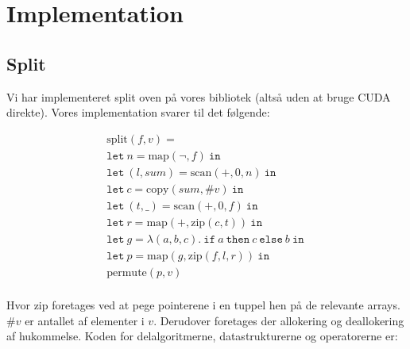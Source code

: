 

\section{Implementation}
\label{implementation}

\subsection{Split}

Vi har implementeret split oven på vores bibliotek (altså uden at bruge
CUDA direkte). Vores implementation svarer til det følgende:

\[
\begin{array}{l}
\mbox{split} (f, v) = \\
\mathtt{let\ } n = \mbox{map} (\neg, f) \mathtt{\ in\ } \\
\mathtt{let\ } (l, sum) = \mbox{scan} (+, 0, n) \mathtt{\ in\ } \\
\mathtt{let\ } c = \mbox{copy} (sum, \#v) \mathtt{\ in\ } \\
\mathtt{let\ } (t, \_) = \mbox{scan} (+, 0, f) \mathtt{\ in\ } \\
\mathtt{let\ } r = \mbox{map} (+, \mbox{zip}(c, t)) \mathtt{\ in\ } \\
\mathtt{let\ } g = \lambda (a, b, c). \mathtt{\ if\ } a \mathtt{\ then\ } c \mathtt{\ else\ } b \mathtt{\ in\ } \\
\mathtt{let\ } p = \mbox{map} (g, \mbox{zip} (f, l, r)) \mathtt{\ in\ } \\
\mbox{permute} (p, v) \\
\end{array}
\]

Hvor $\mbox{zip}$ foretages ved at pege pointerene i en tuppel
hen på de relevante arrays. $\#v$ er antallet af elementer i $v$.
Derudover foretages der allokering og deallokering
af hukommelse. Koden for delalgoritmerne, datastrukturerne og operatorerne er:

